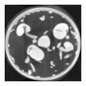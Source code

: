 \documentclass[journal]{IEEEtran}
\begin{document}
\begin{figure}[!h]
\begin{subfigure}[b]{0.3\linewidth}
\captionsetup{labelformat=empty}
        \caption{}
     \end{subfigure}
\quad
    \begin{subfigure}[b]{0.3\linewidth}
        \includegraphics[width=\textwidth]{../images/sprouts/template_5.png}
\captionsetup{labelformat=empty}
        \caption{}
     \end{subfigure}
\quad
    \begin{subfigure}[b]{0.29\linewidth}

\end{subfigure}
\end{figure}
\end{document}
